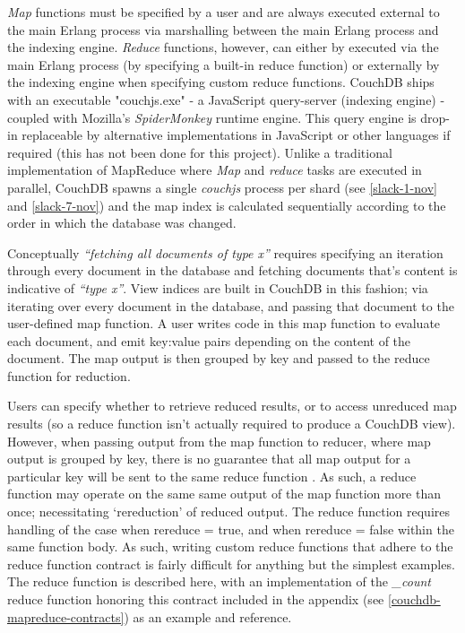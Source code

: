 \textit{Map} functions must be specified by a user and are always executed external to the main Erlang process via marshalling between the main Erlang process and the indexing engine. \textit{Reduce} functions, however, can either by executed via the main Erlang process (by specifying a built-in reduce function) or externally by the indexing engine when specifying custom reduce functions. CouchDB ships with an executable "couchjs.exe" - a JavaScript query-server (indexing engine) - coupled with Mozilla's \textit{SpiderMonkey} runtime engine. This query engine is drop-in replaceable by alternative implementations in JavaScript or other languages if required (this has not been done for this project). Unlike a traditional implementation of MapReduce where \textit{Map} and \textit{reduce} tasks are executed in parallel, CouchDB spawns a single \textit{couchjs} process per shard (see \ref{slack-1-nov} and \ref{slack-7-nov}) and the map index is calculated sequentially according to the order in which the database was changed.

Conceptually \textit{``fetching all documents of type x''} requires specifying an iteration through every document in the database and fetching documents that's content is indicative of \textit{``type x''}. View indices are built in CouchDB in this fashion; via iterating over every document in the database, and passing that document to the user-defined map function. A user writes code in this map function to evaluate each document, and emit key:value pairs depending on the content of the document. The map output is then grouped by key and passed to the reduce function for reduction.

Users can specify whether to retrieve reduced results, or to access unreduced map results (so a reduce function isn't actually required to produce a CouchDB view). However, when passing output from the map function to reducer, where map output is grouped by key, there is no guarantee that all map output for a particular key will be sent to the same reduce function \cite{reduceFunctions}. As such, a reduce function may operate on the same same output of the map function more than once; necessitating `rereduction' of reduced output. The reduce function requires handling of the case when rereduce = true, and when rereduce = false within the same function body. As such, writing custom reduce functions that adhere to the reduce function contract is fairly difficult for anything but the simplest examples. The reduce function is described here, with an implementation of the \textit{\_count} reduce function honoring this contract included in the appendix (see \ref{couchdb-mapreduce-contracts}) as an example and reference.

